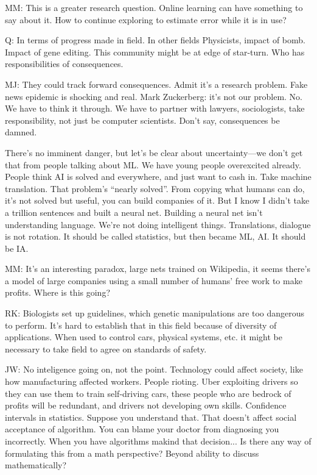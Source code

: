 MM: This is a greater research question. Online learning can have something to say about it. How to continue exploring to estimate error while it is in use?

Q: In terms of progress made in field. In other fields Physicists, impact of bomb. Impact of gene editing. This community might be at edge of star-turn. Who has responsibilities of consequences. 

MJ: They could track forward consequences. Admit it's a research problem. Fake news epidemic is shocking and real.  Mark Zuckerberg: it's not our problem. No. We have to think it through. We have to partner with lawyers, sociologists, take responsibility, not just be computer scientists. %
Don't say, consequences be damned. 

There's no imminent danger, but let's be clear about uncertainty---we don't get that from people talking about ML. We have young people overexcited already. People think AI is solved and everywhere, and just want to cash in. Take machine translation. That problem's ``nearly solved''. From copying what humans can do, it's not solved but useful, you can build companies of it. But I know I didn't take a trillion sentences and built a neural net. Building a neural net isn't understanding language. We're not doing intelligent things. Translations, dialogue is not rotation. It should be called statistics, but then became ML, AI. It should be IA. 

MM: It's an interesting paradox, large nets trained on Wikipedia, it seems there's a model of large companies using a small number of humans' free work to make profits. Where is this going? 

RK: Biologists set up guidelines, which genetic manipulations are too dangerous to perform. It's hard to establish that in this field because of diversity of applications. When used to control cars, physical systems, etc. it might be necessary to take field to agree on standards of safety. 

JW: No inteligence going on, not the point. Technology could affect society, like how manufacturing affected workers. People rioting. Uber exploiting drivers so they can use them to train self-driving cars, these people who are bedrock of profits  will be redundant, and drivers not developing own skills. %
Confidence intervals in statistics. Suppose you understand that. That doesn't affect social acceptance of algorithm. You can blame your doctor from diagnosing you incorrectly. When you have algorithms makind that decision... Is there any way of formulating this from a math perspective? Beyond ability to discuss mathematically?

